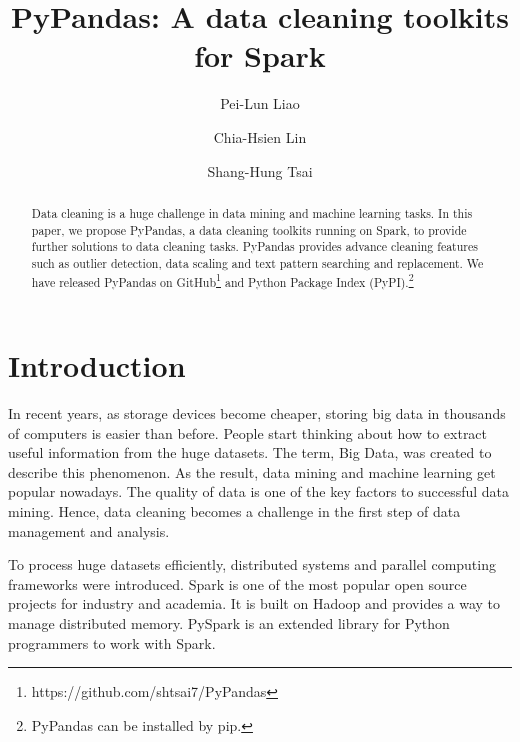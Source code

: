 \documentclass[sigconf]{acmart}
\begin{document}
\title{PyPandas: A data cleaning toolkits for Spark}

\author{Pei-Lun Liao}

\author{Chia-Hsien Lin}

\author{Shang-Hung Tsai}

\begin{abstract}
Data cleaning is a huge challenge in data mining and machine learning tasks. In this paper, we propose PyPandas, a data cleaning toolkits running on Spark, to provide further solutions to data cleaning tasks. PyPandas provides advance cleaning features such as outlier detection, data scaling and text pattern searching and replacement. We have released PyPandas on GitHub\footnote{https://github.com/shtsai7/PyPandas} and Python Package Index (PyPI).\footnote{PyPandas can be installed by pip.}
\end{abstract}

\maketitle

\section{Introduction}
In recent years, as storage devices become cheaper, storing big data in thousands of computers is easier than before. People start thinking about how to extract useful information from the huge datasets. The term, Big Data, was created to describe this phenomenon\cite{bigdata}. As the result, data mining\cite{Han, MMD} and machine learning\cite{ml} get popular nowadays. The quality of data is one of the key factors to successful data mining\cite{dataquality}. Hence, data cleaning becomes a challenge in the first step of data management and analysis\cite{datacleaning, DBS-045, PW}.
	
To process huge datasets efficiently, distributed systems and parallel computing frameworks\cite{mapreduce, gfs, hadoop} were introduced. Spark\cite{spark} is one of the most popular open source projects for industry and academia. It is built on Hadoop\cite{hadoop} and provides a way to manage distributed memory. PySpark\cite{pyspark} is an extended library for Python programmers to work with Spark.
	
\end{document}
